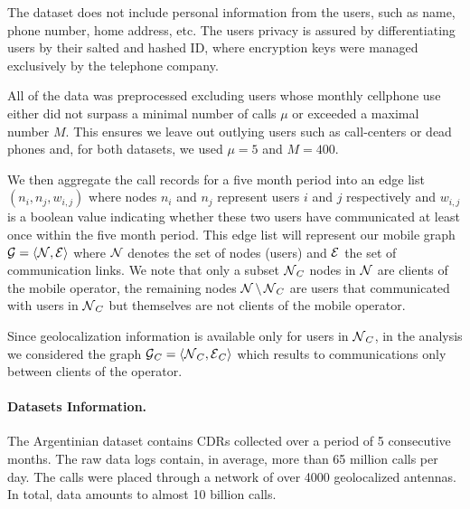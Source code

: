 The dataset does not include personal information from the users, such as name, phone number, home address, etc.
The users privacy is assured by differentiating users by their salted and hashed ID, where encryption keys were managed exclusively by the telephone company.

All of the data was preprocessed excluding users whose monthly cellphone use either did not surpass a minimal number of calls $\mu$ or exceeded a maximal number $M$.
This ensures we leave out outlying users such as call-centers or dead phones and, for both datasets, we used $\mu = 5$ and $M = 400$.

We then aggregate the call records for a five month period into an edge list $(n_i, n_j, w_{i,j})$ where nodes $n_i$ and $n_j$
represent users $i$ and $j$ respectively and $w_{i,j}$ is a boolean value indicating whether these two users have communicated at least once within the five month period.
This edge list will represent our mobile graph
$\operatorname{\mathcal{G}} = \left< \operatorname{\mathcal{N}}, \operatorname{\mathcal{E}} \right> $ where $\operatorname{\mathcal{N}}$ denotes the set of nodes (users) and $\operatorname{\mathcal{E}}$ the set of communication links.
We note that only a subset $\operatorname{\mathcal{N}}_C$ nodes in $\operatorname{\mathcal{N}}$ are clients of the mobile operator, the remaining nodes $\operatorname{\mathcal{N}} \setminus \operatorname{\mathcal{N}}_C$ are users that communicated with users in $ \operatorname{\mathcal{N}}_C $ but themselves are not clients of the mobile operator.

Since geolocalization information is available only for users in $\operatorname{\mathcal{N}}_C$, in the analysis we considered the graph $\operatorname{\mathcal{G}}_C = \left< \operatorname{\mathcal{N}}_C, \operatorname{\mathcal{E}}_C \right>$ which results to communications only between clients of the operator.

\paragraph{Datasets Information.}

The Argentinian dataset contains CDRs collected over a period of 5 consecutive months.
The raw data logs contain, in average, more than 65 million calls per day.
The calls were placed through a network of over 4000 geolocalized antennas.
In total, data amounts to almost 10 billion calls.

